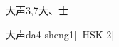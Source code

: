 \begin{entry}{大声}{3,7}{⼤、⼠}
  \begin{phonetics}{大声}{da4 sheng1}[][HSK 2]
  \end{phonetics}
\end{entry}

